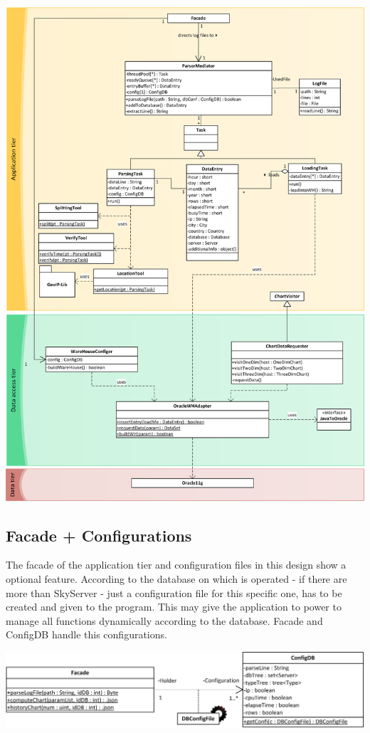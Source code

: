 \begin{center}
\includegraphics[width=0.9\linewidth]{Pictures/AppTierDia2.png}
\end{center}  

\subsection{Facade + Configurations}
The facade of the application tier and configuration files in this design show a
optional feature. According to the database on which is operated - if there are more
than SkyServer - just a configuration file for this specific one, has to be created and
given to the program. This may give the application to power to manage all functions dynamically
according to the database. Facade and ConfigDB handle this configurations.


\begin{center}
\includegraphics{Pictures/Parts/FacadeConfi.png}
\end{center}   


